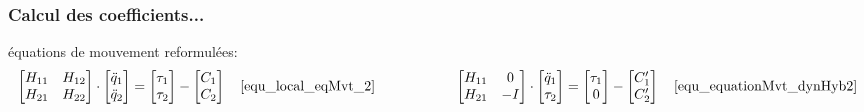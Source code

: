 \documentclass[10pt]{beamer}
\begin{document}
\begin{frame}
  \frametitle{Calcul des coefficients...}
  
  	\begin{block}{\footnotesize{équations de mouvement reformulées:}}\tiny
  	\setlength\abovedisplayskip{0pt}
  	\setlength\belowdisplayskip{0pt}
  \begin{align*}
  	\begin{bmatrix}
	  H_{11} & H_{12} \\
	  H_{21} & H_{22}
	\end{bmatrix} 
	\cdot
	\begin{bmatrix}
	  \ddot{q}_{1} \\
	  \ddot{q}_{2}
	\end{bmatrix} 
	= 
	\begin{bmatrix}
	  \tau_{1} \\
	  \tau_{2}
	\end{bmatrix} 
	-
	\begin{bmatrix}
	  C_{1} \\
	  C_{2}
	\end{bmatrix} \quad \eqref{equ_local_eqMvt_2} \hspace{2cm}
	\begin{bmatrix}
	  H_{11} & 0 \\
	  H_{21} &  -I
	\end{bmatrix} 
	\cdot
	\begin{bmatrix}
	  \ddot{q}_1 \\
	  \tau_2
	\end{bmatrix} 
	=
	\begin{bmatrix}
	  \tau_1 \\
	  0
	\end{bmatrix} 
	-
	\begin{bmatrix}
	  C'_{1} \\
	  C'_{2}
	\end{bmatrix} \quad \eqref{equ_equationMvt_dynHyb2} \\
	\end{align*}
  \end{block}
  

\end{frame}
\end{document}
